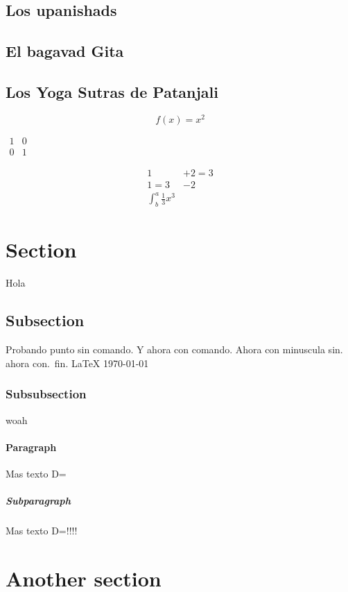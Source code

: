\documentclass[a4paper]{article}
\begin{document}
\subsection{Los upanishads}
\subsection{El bagavad Gita}
\subsection{Los Yoga Sutras de Patanjali}


\begin{equation*} 
	f(x)=x^2
\end{equation*}

$\begin{matrix}
 1 & 0\\
 0 & 1
\end{matrix}$

\begin{align*}
	1 &+ 2 = 3\\
	1 = 3 &- 2\\
	\int^a_b \frac{1}{3}x^3
 \end{align*}


\section{Section}

Hola

\subsection{Subsection}

Probando punto sin comando. Y ahora con comando\@. Ahora con minuscula sin. ahora con.\ fin.
\LaTeX
\today

\subsubsection{Subsubsection}
woah

\paragraph{Paragraph}
Mas texto D=

\subparagraph{Subparagraph}

Mas texto D=!!!!
 
\section{Another section}
\end{document}
